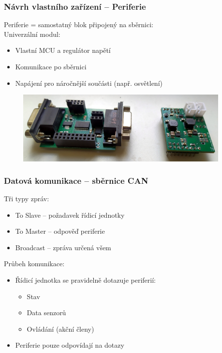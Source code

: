 \documentclass[%
  12pt,       				%
	t,                  %
	aspectratio=1610,   %
	unicode,						%
]{beamer}				    	%
\begin{document}
\begin{frame}[fragile]
	\frametitle{Návrh vlastního zařízení -- Periferie}
		Periferie = samostatný blok připojený na sběrnici:\\[1ex]
		Univerzální modul:\\[1ex]
		\begin{itemize}
			\item Vlastní MCU a regulátor napětí
			\item Komunikace po sběrnici 
			\item Napájení pro náročnější součásti (např. osvětlení)
		\end{itemize}
		\vspace{1ex}%
		\begin{figure}%
			\includegraphics[width=0.95\textwidth]{obrazky/prezentace/ukazka/modul-perif.jpg}
		\end{figure}


\end{frame}

\begin{frame}[fragile]
	\frametitle{Datová komunikace -- sběrnice  CAN}
	Tři typy zpráv:\\[1ex]
	\begin{itemize}
		\item To Slave -- požadavek řídicí jednotky
		\item To Master -- odpověď periferie
		\item Broadcast -- zpráva určená všem   
	\end{itemize}
	\vspace{2.5ex}%
	Průbeh komunikace:\\[1ex]
	\begin{itemize}
		\item Řídicí jednotka se pravidelně dotazuje periferií:
		\begin{itemize}
			\item Stav
			\item Data senzorů 
			\item Ovládání (akční členy)
		\end{itemize}
		\item Periferie pouze odpovídají na dotazy
	\end{itemize}
\end{frame}
\end{document}

